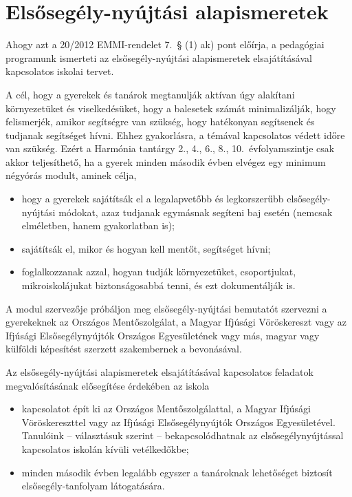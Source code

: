 \section{Elsősegély-nyújtási alapismeretek}
\label{sec:elsosegely}
Ahogy azt a 20/2012 EMMI-rendelet 7.~§ (1) ak) pont előírja, a pedagógiai programunk ismerteti az elsősegély-nyújtási alapismeretek elsajátításával kapcsolatos iskolai tervet.

A cél, hogy a gyerekek és tanárok megtanulják aktívan úgy alakítani környezetüket és viselkedésüket, hogy a balesetek számát minimalizálják, hogy felismerjék, amikor segítségre van szükség, hogy hatékonyan segítsenek és tudjanak segítséget hívni. Ehhez gyakorlásra, a témával kapcsolatos védett időre van szükség. Ezért a Harmónia tantárgy 2., 4., 6., 8., 10.~évfolyamszintje csak akkor teljesíthető, ha a gyerek minden második évben elvégez egy minimum négyórás modult, aminek célja,
\begin{itemize}
    \item hogy a gyerekek sajátítsák el a legalapvetőbb és legkorszerűbb el\-ső\-se\-gély-nyújtási módokat, azaz tudjanak egymásnak segíteni baj esetén (nemcsak elméletben, hanem gyakorlatban is);
    \item sajátítsák el, mikor és hogyan kell mentőt, segítséget hívni;
    \item foglalkozzanak azzal, hogyan tudják környezetüket, csoportjukat, mikroiskolájukat biztonságosabbá tenni, és ezt dokumentálják is.
\end{itemize}

A modul szervezője próbáljon meg elsősegély-nyújtási bemutatót szervezni a gyerekeknek az Országos Mentőszolgálat, a Magyar Ifjúsági Vöröskereszt vagy az Ifjúsági Elsősegélynyújtók Országos Egyesületének vagy más, magyar vagy külföldi képesítést szerzett szakembernek a bevonásával.

Az elsősegély-nyújtási alapismeretek elsajátításával
kapcsolatos\linebreak
feladatok megvalósításának elősegítése érdekében az iskola
\begin{itemize}
    \item kapcsolatot épít ki az Országos Mentőszolgálattal, a Magyar Ifjúsági Vöröskereszttel vagy az Ifjúsági Elsősegélynyújtók Országos Egyesületével. Tanulóink -- választásuk szerint -- bekapcsolódhatnak az elsősegélynyújtással kapcsolatos iskolán kívüli vetélkedőkbe;
    \item  minden második évben legalább egyszer a tanároknak lehetőséget biztosít elsősegély-tanfolyam látogatására.

\end{itemize}

